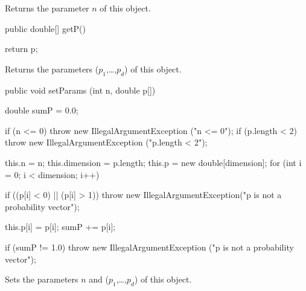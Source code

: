 \begin{tabb}
   Returns the parameter $n$ of this object.
\end{tabb}
\begin{code}

   public double[] getP()\begin{hide} {
      return p;
   }\end{hide}
\end{code}
\begin{tabb}
   Returns the parameters ($p_1$,\ldots,$p_d$) of this object.
\end{tabb}
\begin{code}

   public void setParams (int n, double p[])\begin{hide} {
      double sumP = 0.0;

      if (n <= 0)
         throw new IllegalArgumentException ("n <= 0");
      if (p.length < 2)
         throw new IllegalArgumentException ("p.length < 2");

      this.n = n;
      this.dimension = p.length;
      this.p = new double[dimension];
      for (int i = 0; i < dimension; i++)
      {
         if ((p[i] < 0) || (p[i] > 1))
            throw new IllegalArgumentException("p is not a probability vector");

         this.p[i] = p[i];
         sumP += p[i];
      }

      if (sumP != 1.0)
         throw new IllegalArgumentException ("p is not a probability vector");
   }\end{hide}
\end{code}
\begin{tabb}
   Sets the parameters $n$ and ($p_1$,\ldots,$p_d$) of this object.
\end{tabb}
\begin{code}\begin{hide}
}\end{hide}
\end{code}
